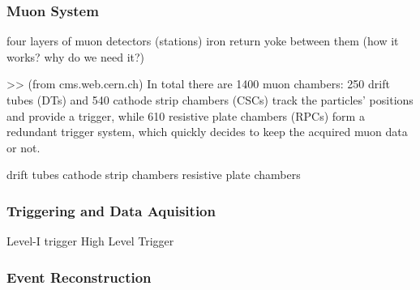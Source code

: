 \subsubsection{Muon System}
four layers of muon detectors (stations)
iron return yoke between them (how it works? why do we need it?)

>> (from cms.web.cern.ch) In total there are 1400 muon chambers: 250 drift tubes (DTs) and 540 cathode strip chambers (CSCs) track the particles’ positions and provide a trigger, while 610 resistive plate chambers (RPCs) form a redundant trigger system, which quickly decides to keep the acquired muon data or not. 

drift tubes
cathode strip chambers
resistive plate chambers

\subsubsection{Triggering and Data Aquisition}
Level-I trigger
High Level Trigger

\subsubsection{Event Reconstruction}

